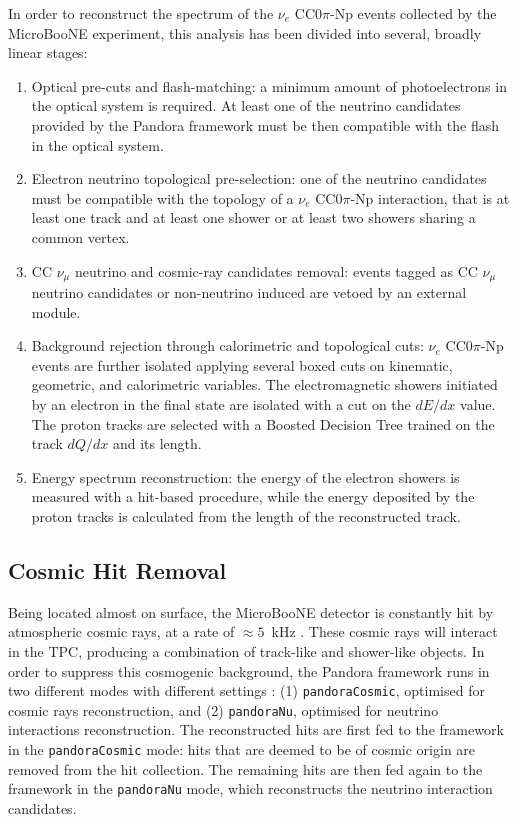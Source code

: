 In order to reconstruct the spectrum of the $\nu_{e}$ CC0$\pi$-Np events collected by the MicroBooNE experiment, this analysis has been divided into several, broadly linear stages:
\begin{enumerate}
\item Optical pre-cuts and flash-matching: a minimum amount of photoelectrons in the optical system is required. At least one of the neutrino candidates provided by the Pandora framework must be then compatible with the flash in the optical system.
\item Electron neutrino topological pre-selection: one of the neutrino candidates must be compatible with the topology of a $\nu_{e}$ CC0$\pi$-Np interaction, that is at least one track and at least one shower or at least two showers sharing a common vertex.
\item CC $\nu_{\mu}$ neutrino and cosmic-ray candidates removal: events tagged as CC $\nu_{\mu}$ neutrino candidates or non-neutrino induced are vetoed by an external module.
\item Background rejection through calorimetric and topological cuts: $\nu_{e}$ CC0$\pi$-Np events are further isolated applying several boxed cuts on kinematic, geometric, and calorimetric variables. The electromagnetic showers initiated by an electron in the final state are isolated with a cut on the $dE/dx$ value. The proton tracks are selected with a Boosted Decision Tree trained on the track $dQ/dx$ and its length.
\item Energy spectrum reconstruction: the energy of the electron showers is measured with a hit-based procedure, while the energy deposited by the proton tracks is calculated from the length of the reconstructed track. 
\end{enumerate}

\subsection{Cosmic Hit Removal}
Being located almost on surface, the MicroBooNE detector is constantly hit by atmospheric cosmic rays, at a rate of $\approx5$~kHz \cite{cosmic}. These cosmic rays will interact in the TPC, producing a combination of track-like and shower-like objects. 
In order to suppress this cosmogenic background, the Pandora framework runs in two different modes with different settings \cite{pandora}: (1) \texttt{pandoraCosmic}, optimised for cosmic rays reconstruction, and (2) \texttt{pandoraNu}, optimised for neutrino interactions reconstruction.
The reconstructed hits are first fed to the framework in the \texttt{pandoraCosmic} mode: hits that are deemed to be of cosmic origin are removed from the hit collection. The remaining hits are then fed again to the framework in the \texttt{pandoraNu} mode, which reconstructs the neutrino interaction candidates.

